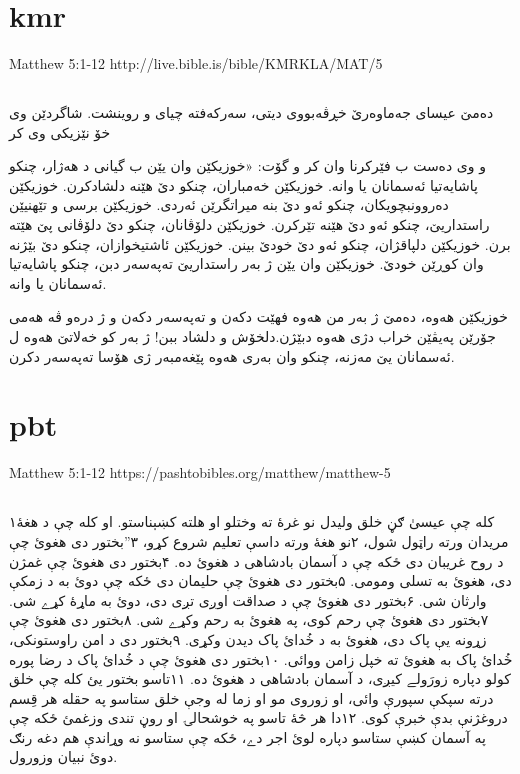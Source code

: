 \documentclass[12pt,fleqn,titlepage,twoside,a4paper]{book}
\begin{document}
\section{kmr}

Matthew 5:1-12 http://live.bible.is/bible/KMRKLA/MAT/5

\begin{arab}[utf]
\section*{}

دەمێ عیسای جەماوەرێ خڕڤەبووی دیتی، سەركەفتە چیای و روینشت. شاگردێن وی خۆ نێزیكی وی كر

و وی دەست ب فێركرنا وان كر و گۆت:
«خوزیكێن وان یێن ب گیانی د هەژار،
چنكو پاشایەتیا ئەسمانان یا وانە.
خوزیكێن خەمباران،
چنكو دێ هێنە دلشادكرن.
خوزیكێن دەروونبچویكان،
چنكو ئەو دێ بنە میراتگرێن ئەردی.
خوزیكێن برسی و تێهنیێن راستداریێ،
چنكو ئەو دێ هێنە تێركرن.
خوزیكێن دلۆڤانان،
چنكو دێ دلۆڤانی پێ هێتە برن.
خوزیكێن دلپاقژان،
چنكو ئەو دێ خودێ بینن.
خوزیكێن ئاشتیخوازان،
چنكو دێ بێژنە وان كوڕێن خودێ.
خوزیكێن وان یێن ژ بەر راستداریێ تەپەسەر دبن،
چنكو پاشایەتیا ئەسمانان یا وانە.

خوزیكێن هەوە، دەمێ ژ بەر من هەوە فهێت دكەن و تەپەسەر دكەن و ژ درەو ڤە هەمی جۆرێن پەیڤێن خراب دژی هەوە دبێژن.دلخۆش و دلشاد ببن! ژ بەر كو خەلاتێ هەوە ل ئەسمانان یێ مەزنە، چنكو وان بەری هەوە پێغەمبەر ژی هۆسا تەپەسەر دكرن.

\end{arab}


\section{pbt}

Matthew 5:1-12 https://pashtobibles.org/matthew/matthew-5

\begin{arab}[utf]
\section*{}



۱کله چې عيسىٰ ګڼ خلق وليدل نو غرۀ ته وختلو او هلته کښېناستو. او کله چې د هغۀ مريدان ورته راټول شول، ۲نو هغۀ ورته داسې تعليم شروع کړو، ۳”بختور دى هغوئ چې د روح غريبان دى ځکه چې د آسمان بادشاهى د هغوئ ده. ۴بختور دى هغوئ چې غمژن دى، هغوئ به تسلى ومومى. ۵بختور دى هغوئ چې حليمان دى ځکه چې دوئ به د زمکې وارثان شى. ۶بختور دى هغوئ چې د صداقت اوږى تږى دى، دوئ به ماړۀ کړے شى. ۷بختور دى هغوئ چې رحم کوى، په هغوئ به رحم وکړے شى. ۸بختور دى هغوئ چې زړونه يې پاک دى، هغوئ به د خُدائ پاک ديدن وکړى. ۹بختور دى د امن راوستونکى، خُدائ پاک به هغوئ ته خپل زامن ووائى. ۱۰بختور دى هغوئ چې د خُدائ پاک د رضا پوره کولو دپاره زورَولے کيږى، د آسمان بادشاهى د هغوئ ده. ۱۱تاسو بختور يئ کله چې خلق درته سپکې سپورې وائى، او زوروى مو او زما له وجې خلق ستاسو په حقله هر قِسم دروغژنې بدې خبرې کوى. ۱۲دا هر څۀ تاسو په خوشحالۍ او روڼ تندى وزغمئ ځکه چې په آسمان کښې ستاسو دپاره لوئ اجر دے، ځکه چې ستاسو نه وړاندې هم دغه رنګ دوئ نبيان وزورول.

\end{arab}
\end{document}
